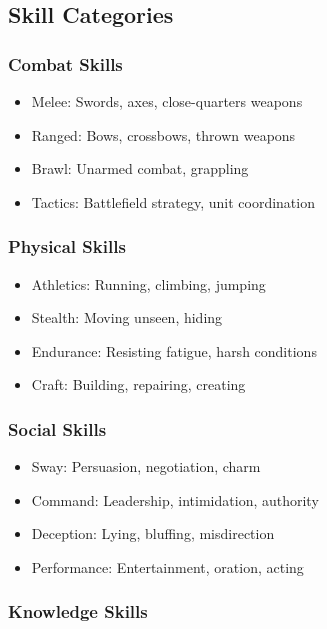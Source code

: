 \documentclass[11pt,twoside,openany]{book}
\begin{document}
\subsection*{Skill Categories}

\subsubsection*{Combat Skills}

\begin{itemize}
\item Melee: Swords, axes, close-quarters weapons
\item Ranged: Bows, crossbows, thrown weapons
\item Brawl: Unarmed combat, grappling
\item Tactics: Battlefield strategy, unit coordination
\end{itemize}

\subsubsection*{Physical Skills}

\begin{itemize}
\item Athletics: Running, climbing, jumping
\item Stealth: Moving unseen, hiding
\item Endurance: Resisting fatigue, harsh conditions
\item Craft: Building, repairing, creating
\end{itemize}

\subsubsection*{Social Skills}

\begin{itemize}
\item Sway: Persuasion, negotiation, charm
\item Command: Leadership, intimidation, authority
\item Deception: Lying, bluffing, misdirection
\item Performance: Entertainment, oration, acting
\end{itemize}

\subsubsection*{Knowledge Skills}
\end{document}
